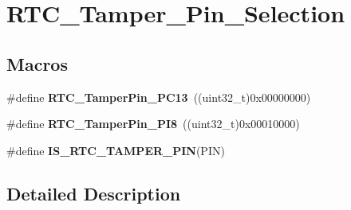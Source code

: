 \hypertarget{group___r_t_c___tamper___pin___selection}{\section{R\-T\-C\-\_\-\-Tamper\-\_\-\-Pin\-\_\-\-Selection}
\label{group___r_t_c___tamper___pin___selection}
}
\subsection*{Macros}
\begin{DoxyCompactItemize}
\item 
\hypertarget{group___r_t_c___tamper___pin___selection_ga40931f48b0d647e0a1e96f12e1321bd1}{\#define {\bfseries R\-T\-C\-\_\-\-Tamper\-Pin\-\_\-\-P\-C13}~((uint32\-\_\-t)0x00000000)}\label{group___r_t_c___tamper___pin___selection_ga40931f48b0d647e0a1e96f12e1321bd1}

\item 
\hypertarget{group___r_t_c___tamper___pin___selection_gafef092b812feb1d759c7b6cd0ca8d858}{\#define {\bfseries R\-T\-C\-\_\-\-Tamper\-Pin\-\_\-\-P\-I8}~((uint32\-\_\-t)0x00010000)}\label{group___r_t_c___tamper___pin___selection_gafef092b812feb1d759c7b6cd0ca8d858}

\item 
\#define {\bfseries I\-S\-\_\-\-R\-T\-C\-\_\-\-T\-A\-M\-P\-E\-R\-\_\-\-P\-I\-N}(P\-I\-N)
\end{DoxyCompactItemize}


\subsection{Detailed Description}



